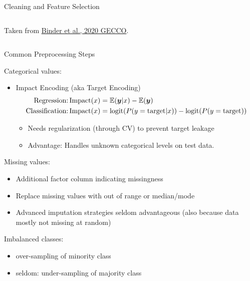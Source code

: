 \begin{frame}{Cleaning and Feature Selection}
\begin{columns}
\begin{column}{0.3\textwidth}
\begin{center}
          {\tiny Taken from \href{https://doi.org/10.1145/3377930.3389815}{Binder et al., 2020 GECCO}.}
        \end{center}
      \end{column}
    \end{columns}
\end{frame}

\begin{frame}{Common Preprocessing Steps}

  Categorical values:
  \begin{itemize}
    \item Impact Encoding (aka Target Encoding) \\
    \vspace*{-0.5cm}  
      \begin{align*}
        \text{Regression:} \operatorname{Impact}(x) &= \operatorname*{\mathbb{E}}(\bm{y} | x) - \operatorname*{\mathbb{E}}(\bm{y}) \\
        \text{Classification:} \operatorname{Impact}(x) &= \operatorname{logit}(P( y = \text{target} | x)) - \operatorname{logit}(P( y = \text{target}))
      \end{align*}
      \vspace*{-0.5cm}  
      \begin{itemize}
        \item Needs regularization (through CV) to prevent target leakage 
        \item Advantage: Handles unknown categorical levels on test data.
      \end{itemize}
  \end{itemize}
  
  Missing values:
  \begin{itemize}
    \item Additional factor column indicating missingness
    \item Replace missing values with out of range or median/mode
    \item Advanced imputation strategies seldom advantageous (also because data mostly not missing at random)
  \end{itemize}
  
  Imbalanced classes:
  \begin{itemize}
    \item over-sampling of minority class
    \item seldom: under-sampling of majority class
  \end{itemize}

\end{frame}


